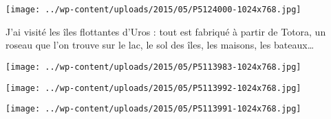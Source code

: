  

 

\begin{center} \texttt{[image: ../wp-content/uploads/2015/05/P5124000-1024x768.jpg]} \end{center}

 

 J'ai visité les îles flottantes d'Uros : tout est fabriqué à partir de Totora, un roseau que l'on trouve sur le lac, le sol des îles, les maisons, les bateaux… 

 

\begin{center} \texttt{[image: ../wp-content/uploads/2015/05/P5113983-1024x768.jpg]} \end{center}

 

 

\begin{center} \texttt{[image: ../wp-content/uploads/2015/05/P5113992-1024x768.jpg]} \end{center}

 

 

\begin{center} \texttt{[image: ../wp-content/uploads/2015/05/P5113991-1024x768.jpg]} \end{center}




 
 
